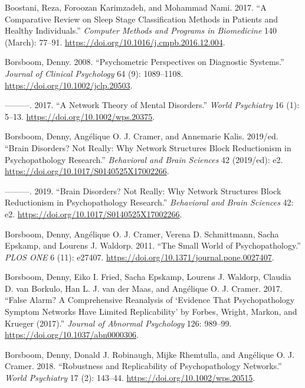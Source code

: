 \documentclass[
  a4paper,
  DIV=11,
  numbers=noendperiod,
  oneside]{scrreprt}
\newlength{\cslhangindent}
\newlength{\cslentryspacingunit} %
\newenvironment{CSLReferences}[2] %
 {%
  \setlength{\parindent}{0pt}
  \ifodd #1
  \let\oldpar\par
  \def\par{\hangindent=\cslhangindent\oldpar}
  \fi
  \setlength{\parskip}{#2\cslentryspacingunit}
 }%
 {}
\begin{document}
\begin{CSLReferences}{1}{0}
\leavevmode{}%
Boostani, Reza, Foroozan Karimzadeh, and Mohammad Nami. 2017. {``A
Comparative Review on Sleep Stage Classification Methods in Patients and
Healthy Individuals.''} \emph{Computer Methods and Programs in
Biomedicine} 140 (March): 77--91.
\url{https://doi.org/10.1016/j.cmpb.2016.12.004}.

\leavevmode{}%
Borsboom, Denny. 2008. {``Psychometric Perspectives on Diagnostic
Systems.''} \emph{Journal of Clinical Psychology} 64 (9): 1089--1108.
\url{https://doi.org/10.1002/jclp.20503}.

\leavevmode{}%
---------. 2017. {``A Network Theory of Mental Disorders.''} \emph{World
Psychiatry} 16 (1): 5--13. \url{https://doi.org/10.1002/wps.20375}.

\leavevmode{}%
Borsboom, Denny, Angélique O. J. Cramer, and Annemarie Kalis. 2019/ed.
{``Brain Disorders? {Not} Really: {Why} Network Structures Block
Reductionism in Psychopathology Research.''} \emph{Behavioral and Brain
Sciences} 42 (2019/ed): e2.
\url{https://doi.org/10.1017/S0140525X17002266}.

\leavevmode{}%
---------. 2019. {``Brain Disorders? Not Really: Why Network Structures
Block Reductionism in Psychopathology Research.''} \emph{Behavioral and
Brain Sciences} 42: e2. \url{https://doi.org/10.1017/S0140525X17002266}.

\leavevmode{}%
Borsboom, Denny, Angélique O. J. Cramer, Verena D. Schmittmann, Sacha
Epskamp, and Lourens J. Waldorp. 2011. {``The {Small World} of
{Psychopathology}.''} \emph{PLOS ONE} 6 (11): e27407.
\url{https://doi.org/10.1371/journal.pone.0027407}.

\leavevmode{}%
Borsboom, Denny, Eiko I. Fried, Sacha Epskamp, Lourens J. Waldorp,
Claudia D. van Borkulo, Han L. J. van der Maas, and Angélique O. J.
Cramer. 2017. {``False Alarm? {A} Comprehensive Reanalysis of
{`{Evidence} That Psychopathology Symptom Networks Have Limited
Replicability'} by {Forbes}, {Wright}, {Markon}, and {Krueger}
(2017).''} \emph{Journal of Abnormal Psychology} 126: 989--99.
\url{https://doi.org/10.1037/abn0000306}.

\leavevmode{}%
Borsboom, Denny, Donald J. Robinaugh, Mijke Rhemtulla, and Angélique O.
J. Cramer. 2018. {``Robustness and Replicability of Psychopathology
Networks.''} \emph{World Psychiatry} 17 (2): 143--44.
\url{https://doi.org/10.1002/wps.20515}.


\end{CSLReferences}
\end{document}
